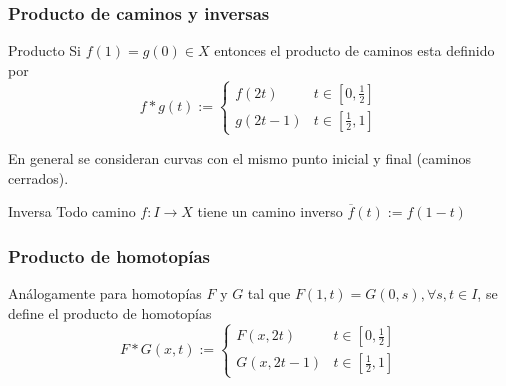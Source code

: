\documentclass[xetex,mathserif,serif]{beamer}
\begin{document}
  \begin{frame}
    \frametitle{Producto de caminos y inversas}
    \begin{block}{Producto}
      Si \(f (1) = g (0) \in X\) entonces el producto de caminos esta
      definido por
      \[ f * g (t) :=
        \begin{cases}
          f(2t) & t \in [0, \frac 1 2] \\
          g(2t - 1) & t \in [\frac 1 2 , 1 ]
        \end{cases}
      \]
      \begin{center}
      \end{center}
      En general se consideran curvas con el mismo punto inicial y final
      (caminos cerrados).
    \end{block}
    \begin{block}{Inversa}
      Todo camino \(f : I \to X\) tiene un camino inverso \(\overline f
      (t) := f( 1 - t)\)
    \end{block}
  \end{frame}

  \begin{frame}
    \frametitle{Producto de homotopías}
    Análogamente para homotopías \(F\) y \(G\) tal que \(F(1, t) =
    G(0,s) , \forall s, t \in I\), se define el producto de homotopías
    \[ F * G (x, t) :=
      \begin{cases}
        F(x, 2t) & t \in [0, \frac 1 2] \\
        G(x, 2t - 1) & t \in [\frac 1 2, 1]
      \end{cases}
    \]

    \begin{center}
    \end{center}
  \end{frame}
\end{document}

